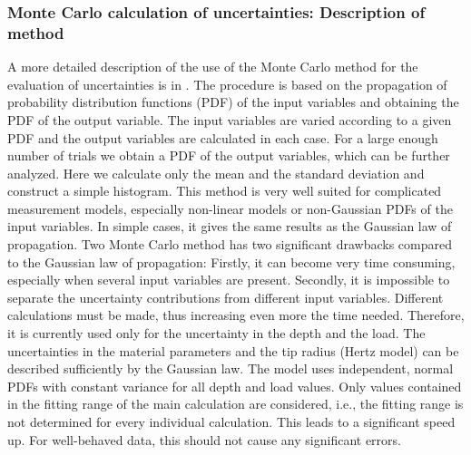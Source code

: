 \subsubsection{Monte Carlo calculation of uncertainties: Description of method} \label{mc_calc}
A more detailed description of the use of the Monte Carlo method for the evaluation of uncertainties is in \cite{GUMSupplement1, GUMSupplement2}. 
The procedure is based on the propagation of probability distribution functions (PDF) of the input variables and obtaining the PDF of the output variable. 
The input variables are varied according to a given PDF and the output variables are calculated in each case. For a large enough number of trials we obtain a PDF of the output variables, which can be further analyzed.
Here we calculate only the mean and the standard deviation and construct a simple histogram.
This method is very well suited for complicated measurement models, especially non-linear models or non-Gaussian PDFs of the input variables. 
In simple cases, it gives the same results as the Gaussian law of propagation.
Two Monte Carlo method has two significant drawbacks compared to the Gaussian law of propagation: 
Firstly, it can become very time consuming, especially when several input variables are present. Secondly, it is impossible to separate the uncertainty contributions from different input variables. Different calculations must be made, thus increasing even more the time needed.
Therefore, it is currently used only for the uncertainty in the depth and the load. The uncertainties in the material parameters and the tip radius (Hertz model) can be described sufficiently by the Gaussian law.
The model uses independent, normal PDFs with constant variance for all depth and load values. Only values contained in the fitting range of the main calculation are considered, i.e., the fitting range is not determined for every individual calculation.
This leads to a significant speed up. For well-behaved data, this should not cause any significant errors. 
